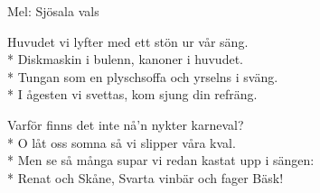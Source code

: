 \begin{SongText}[Antisnapsvisa]
    \begin{SongInfo}
        Mel: Sjösala vals
    \end{SongInfo}
    \begin{SongVerse}
        Huvudet vi lyfter med ett stön ur vår säng.\\*%
        Diskmaskin i bulenn, kanoner i huvudet.\\*%
        Tungan som en plyschsoffa och yrselns i sväng.\\*%
        I ågesten vi svettas, kom sjung din refräng.
    \end{SongVerse}
    \begin{SongVerse}
        Varför finns det inte nå’n nykter karneval?\\*%
        O låt oss somna så vi slipper våra kval.\\*%
        Men se så många supar vi redan kastat upp i sängen:\\*%
        Renat och Skåne, Svarta vinbär och fager Bäsk!
    \end{SongVerse}
\end{SongText}
